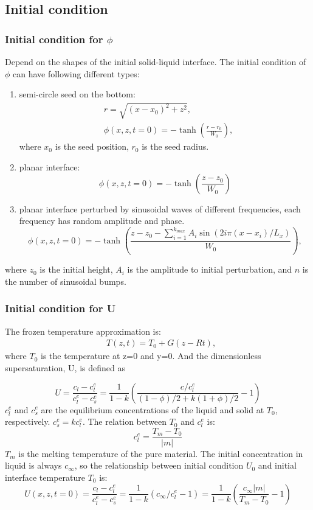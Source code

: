 \documentclass[final,times]{elsarticle}
\numberwithin{equation}{section}
\begin{document}
\subsection{Initial condition}
\subsubsection{Initial condition for $\phi$}
Depend on the shapes of the initial solid-liquid interface. The initial condition of $\phi$ can have following different types:
\begin{enumerate}
\item semi-circle seed on the bottom:
\begin{align}
& r = \sqrt{(x-x_0)^2+z^2},  \\
& \phi(x,z,t=0) = - \tanh \left( \frac{r - r_0 }{W_0}  \right),
\end{align}
where $x_0$ is the seed position, $r_0$ is the seed radius.
\item planar interface:
\begin{equation}
\phi(x,z,t=0) = - \tanh \left( \frac{z - z_0 }{W_0}  \right)
\end{equation}
\item planar interface perturbed by sinusoidal waves of different frequencies, each frequency has random amplitude and phase.
\begin{equation}
\phi(x,z,t=0) = - \tanh \left( \frac{z - z_0 - \sum_{i=1}^{k_{max}} A_i\sin(2i\pi (x-x_i) /L_x ) }{W_0}  \right),
\end{equation}
\end{enumerate}
where $z_0$ is the initial height, $A_i$ is the amplitude to initial perturbation, and $n$ is the number of  sinusoidal bumps.  
\subsubsection{Initial condition for U}
The frozen temperature approximation is:
\begin{align}
    & T(z,t) = T_0 + G(z-Rt),
\end{align}
where $T_0$ is the temperature at z=0 and y=0.
And the dimensionless supersaturation, U, is defined as

\begin{equation}
U=\frac{c_{l}-c_{l}^{e}}{c_{l}^{e}-c_{s}^{e}}=\frac{1}{1-k} \left( \frac{ c/c_l^e}{(1-\phi)/2 + k(1+\phi)/2} -1\right)
\end{equation}
$c_l^e$ and $c_s^e$ are the equilibrium concentrations of the liquid and solid at $T_0$, respectively. $c_s^e=kc_l^e$.
The relation between $T_0$ and $c_l^e$ is:
\begin{equation}
c_l^e = \frac{T_m-T_0}{|m|}
\end{equation}
$T_m$ is the melting temperature of the pure material.
The initial concentration in liquid is always $c_{\infty}$, so the relationship between initial condition $U_0$ and initial interface temperature $T_0$ is:
\begin{equation}
U(x,z,t=0)=\frac{c_{l}-c_{l}^{e}}{c_{l}^{e}-c_{s}^{e}}=\frac{1}{1-k} ({ c_{\infty}/c_l^e}-1)=\frac{1}{1-k} (\frac{ c_{\infty}|m|}{T_m-T_0}-1)
\end{equation}
\end{document}

